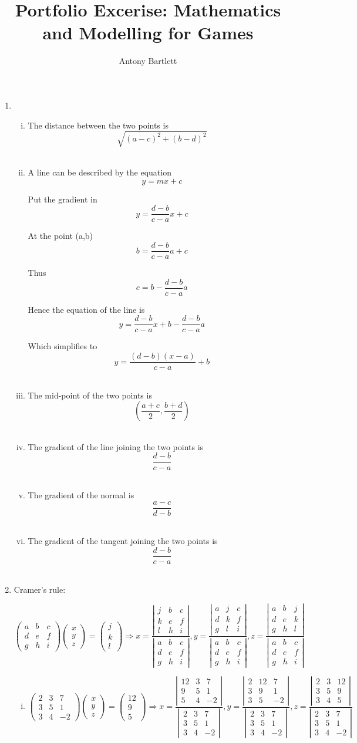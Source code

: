 \documentclass{article}
\def\cramersMatrix#1#2#3#4#5#6#7#8#9{
  \def\a{{#1}}
  \def\b{{#2}}
  \def\c{{#3}}
  \def\d{{#4}}
  \def\e{{#5}}
  \def\f{{#6}}
  \def\g{{#7}}
  \def\h{{#8}}
  \def\i{{#9}}
}
\def\cramersVector#1#2#3{
  \def\j{{#1}}
  \def\k{{#2}}
  \def\l{{#3}}
}
\newcommand{\cramers}[0]
{
\[
	\left(
		\begin{array}{ccc}
			\a & \b & \c \\
			\d & \e & \f \\
			\g & \h & \i
		\end{array}
	\right)
	\left(
		\begin{array}{c}
			x \\
			y \\
			z
		\end{array}
	\right)
	=
	\left(
		\begin{array}{c}
			\j \\
			\k \\
			\l
		\end{array}
	\right)
	\Rightarrow
	x=
	\frac
	{
		\left|
			\begin{array}{ccc}
				\j & \b & \c \\
				\k & \e & \f \\
				\l & \h & \i
			\end{array}
		\right|
	}
	{
		\left|
			\begin{array}{ccc}
				\a & \b & \c \\
				\d & \e & \f \\
				\g & \h & \i
			\end{array}
		\right|
	},
	y=
	\frac
	{
		\left|
			\begin{array}{ccc}
				\a & \j & \c \\
				\d & \k & \f \\
				\g & \l & \i
			\end{array}
		\right|
	}
	{
		\left|
			\begin{array}{ccc}
				\a & \b & \c \\
				\d & \e & \f \\
				\g & \h & \i
			\end{array}
		\right|
	},
	z=
	\frac
	{
		\left|
			\begin{array}{ccc}
				\a & \b & \j \\
				\d & \e & \k \\
				\g & \h & \l
			\end{array}
		\right|
	}
	{
		\left|
			\begin{array}{ccc}
				\a & \b & \c \\
				\d & \e & \f \\
				\g & \h & \i
			\end{array}
		\right|
	}
\]
}
\begin{document}
\title{Portfolio Excerise: Mathematics and Modelling for Games}
\author{Antony Bartlett}
\maketitle
\begin{enumerate}

\item

\begin{enumerate}[i.]

\item The distance between the two points is
\[
\sqrt{ (a-c)^2 + (b-d)^2 }
\]
\\

\item A line can be described by the equation
\[
y=mx+c
\]

Put the gradient in
\[
y=\frac{d-b}{c-a}x+c
\]

At the point (a,b)
\[
b=\frac{d-b}{c-a}a + c
\]

Thus
\[
c=b - \frac{d-b}{c-a}a
\]

Hence the equation of the line is
\[
y=\frac{d-b}{c-a}x+b - \frac{d-b}{c-a}a
\]

Which simplifies to
\[
y=\frac{(d-b)(x-a)}{c-a} + b
\]
\\

\item The mid-point of the two points is
\[
(\frac{a+c}{2}, \frac{b+d}{2})
\]
\\

\item The gradient of the line joining the two points is
\[
\frac{d-b}{c-a}
\]
\\

\item The gradient of the normal is
\[
\frac{a-c}{d-b}
\]
\\

\item The gradient of the tangent joining the two points is
\[
\frac{d-b}{c-a}
\]
\\

\end{enumerate}

\item Cramer's rule:
\cramersMatrix{a}{b}{c}{d}{e}{f}{g}{h}{i}
\cramersVector{j}{k}{l}
\cramers

\begin{enumerate}[i.]

\item
\cramersMatrix{2}{3}{7}{3}{5}{1}{3}{4}{-2}
\cramersVector{12}{9}{5}
\cramers

\end{enumerate}

\end{enumerate}
\end{document}
